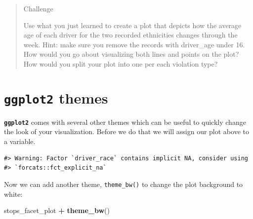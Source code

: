 \documentclass[]{book}
\newenvironment{Shaded}{\begin{snugshade}}{\end{snugshade}}
\newcommand{\CommentTok}[1]{\textcolor[rgb]{0.56,0.35,0.01}{\textit{#1}}}
\newcommand{\DataTypeTok}[1]{\textcolor[rgb]{0.13,0.29,0.53}{#1}}
\newcommand{\KeywordTok}[1]{\textcolor[rgb]{0.13,0.29,0.53}{\textbf{#1}}}
\newcommand{\NormalTok}[1]{#1}
\newcommand{\OperatorTok}[1]{\textcolor[rgb]{0.81,0.36,0.00}{\textbf{#1}}}
\newcommand{\StringTok}[1]{\textcolor[rgb]{0.31,0.60,0.02}{#1}}
\begin{document}
\begin{quote}
Challenge

Use what you just learned to create a plot that depicts how the average age
of each driver for the two recorded ethnicities changes through the week.
Hint: make sure you remove the records with driver\_age under 16.
How would you go about visualizing both lines and points on the plot?
How would you split your plot into one per each violation type?
\end{quote}

\hypertarget{ggplot2-themes}{%
\section{\texorpdfstring{\textbf{\texttt{ggplot2}} themes}{ggplot2 themes}}\label{ggplot2-themes}}

\textbf{\texttt{ggplot2}}
comes with several other themes which can be useful to quickly change the look of your visualization. Before we do that we will assign our plot above to a variable.

\begin{Shaded}
\end{Shaded}

\begin{verbatim}
#> Warning: Factor `driver_race` contains implicit NA, consider using
#> `forcats::fct_explicit_na`
\end{verbatim}

Now we can add another theme, \texttt{theme\_bw()} to change the plot background to white:

\begin{Shaded}
\begin{Highlighting}[]
\NormalTok{stops_facet_plot }\OperatorTok{+}
\StringTok{     }\KeywordTok{theme_bw}\NormalTok{()}
\end{Highlighting}
\end{Shaded}
\end{document}
